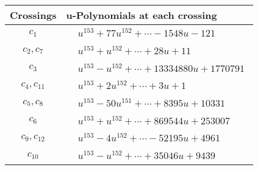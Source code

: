 \documentclass[1p]{elsarticle_modified}
\theoremstyle{definition}
\begin{document}
\begin{tabular}{m{50pt}|m{274pt}}
Crossings & \hspace{64pt}u-Polynomials at each crossing \\
\hline $$\begin{aligned}c_{1}\end{aligned}$$&$\begin{aligned}
&u^{153}+77 u^{152}+\cdots-1548 u-121
\end{aligned}$\\
\hline $$\begin{aligned}c_{2},c_{7}\end{aligned}$$&$\begin{aligned}
&u^{153}+u^{152}+\cdots+28 u+11
\end{aligned}$\\
\hline $$\begin{aligned}c_{3}\end{aligned}$$&$\begin{aligned}
&u^{153}- u^{152}+\cdots+13334880 u+1770791
\end{aligned}$\\
\hline $$\begin{aligned}c_{4},c_{11}\end{aligned}$$&$\begin{aligned}
&u^{153}+2 u^{152}+\cdots+3 u+1
\end{aligned}$\\
\hline $$\begin{aligned}c_{5},c_{8}\end{aligned}$$&$\begin{aligned}
&u^{153}-50 u^{151}+\cdots+8395 u+10331
\end{aligned}$\\
\hline $$\begin{aligned}c_{6}\end{aligned}$$&$\begin{aligned}
&u^{153}+u^{152}+\cdots+869544 u+253007
\end{aligned}$\\
\hline $$\begin{aligned}c_{9},c_{12}\end{aligned}$$&$\begin{aligned}
&u^{153}-4 u^{152}+\cdots-52195 u+4961
\end{aligned}$\\
\hline $$\begin{aligned}c_{10}\end{aligned}$$&$\begin{aligned}
&u^{153}- u^{152}+\cdots+35046 u+9439
\end{aligned}$\\
\hline
\end{tabular}\\~\\
\end{document}
